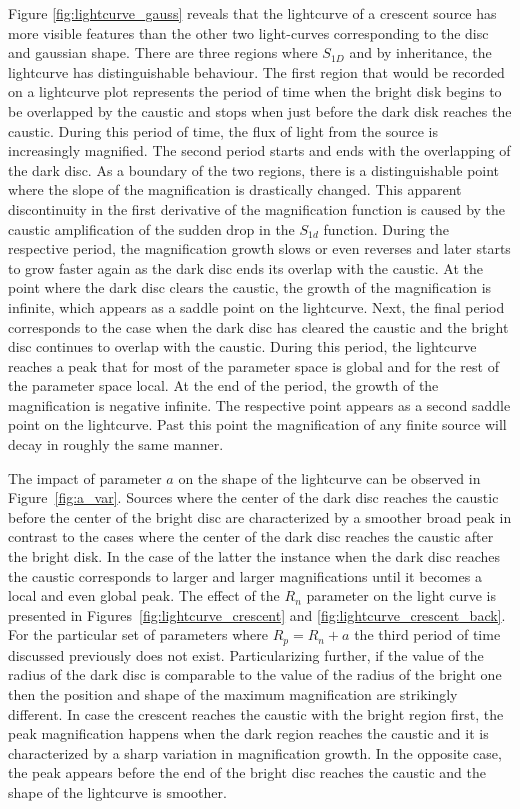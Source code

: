 \documentclass[usenatbib]{mn2e}
\begin{document}
Figure \ref{fig:lightcurve_gauss} reveals that the 
lightcurve of a crescent source has more
visible features than the other two light-curves corresponding to the
disc and gaussian shape. There are three regions where $S_{1D}$ and by
inheritance, the lightcurve has distinguishable behaviour. The first
region that would be recorded on a lightcurve plot represents the
period of time when the bright disk begins to be overlapped by the
caustic and stops when just before the dark disk reaches the
caustic. During this period of time, the flux of light from the source
is increasingly magnified. The second period starts and ends with the
overlapping of the dark disc. As a boundary of the two regions, there
is a distinguishable point where the slope of the magnification is
drastically changed. This apparent discontinuity in the first
derivative of the magnification function is caused by the caustic
amplification of the sudden drop in the $S_{1d}$ function. During the
respective period, the magnification growth slows or even reverses
and later starts to grow faster again as
the dark disc ends its overlap with the caustic. At the point where
the dark disc clears the caustic, the growth of the magnification is
infinite, which appears as a saddle point on the lightcurve. Next, the
final period corresponds to the case when the dark disc has cleared
the caustic and the bright disc continues to overlap with the
caustic. During this period, the lightcurve reaches a peak that for
most of the parameter space is global and for the rest of the
parameter space local.  At the end of the period, the growth of the
magnification is negative infinite. The respective point appears as a
second saddle point on the lightcurve. Past this point the
magnification of any finite source will decay in roughly the same
manner.

The impact of parameter $a$ on the shape of the lightcurve can be
observed in Figure~\ref{fig:a_var}. Sources where the center of the
dark disc reaches the caustic before the center of the bright disc are
characterized by a smoother broad peak in contrast to the cases where
the center of the dark disc reaches the caustic after the bright disk.
In the case of the latter the instance when the dark disc reaches the
caustic corresponds to larger and larger magnifications until it
becomes a local and even global peak. The effect of the $R_n$
parameter on the light curve is presented in
Figures~\ref{fig:lightcurve_crescent} and
\ref{fig:lightcurve_crescent_back}. For the particular set of
parameters where $R_p = R_n +a$ the third period of time discussed
previously does not exist. Particularizing further, if the value of
the radius of the dark disc is comparable to the value of the radius
of the bright one then the position and shape of the maximum
magnification are strikingly different. In case the crescent reaches
the caustic with the bright region first, the peak magnification
happens when the dark region reaches the caustic and it is
characterized by a sharp variation in magnification growth. In the
opposite case, the peak appears before the end of the bright disc
reaches the caustic and the shape of the lightcurve is smoother.
\end{document}
